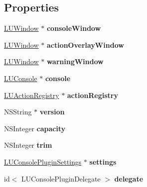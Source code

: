\subsection*{Properties}
\begin{DoxyCompactItemize}
\item 
\mbox{\label{interface_l_u_console_plugin_aaf88d87a74ebf974140af6d50caf53f4}} 
\mbox{\hyperlink{interface_l_u_window}{L\+U\+Window}} $\ast$ {\bfseries console\+Window}
\item 
\mbox{\label{interface_l_u_console_plugin_a374dac0530c45c7497c2d677461c7754}} 
\mbox{\hyperlink{interface_l_u_window}{L\+U\+Window}} $\ast$ {\bfseries action\+Overlay\+Window}
\item 
\mbox{\label{interface_l_u_console_plugin_ad94ff4234448c458582915a5bb0523bb}} 
\mbox{\hyperlink{interface_l_u_window}{L\+U\+Window}} $\ast$ {\bfseries warning\+Window}
\item 
\mbox{\label{interface_l_u_console_plugin_ae475df9e7221f0e7ef4e431c6a31a882}} 
\mbox{\hyperlink{interface_l_u_console}{L\+U\+Console}} $\ast$ {\bfseries console}
\item 
\mbox{\label{interface_l_u_console_plugin_a482862f40da2bea4ee39806c8a41f1fd}} 
\mbox{\hyperlink{interface_l_u_action_registry}{L\+U\+Action\+Registry}} $\ast$ {\bfseries action\+Registry}
\item 
\mbox{\label{interface_l_u_console_plugin_ab712b3b45312b5d76f326f1174a1db49}} 
N\+S\+String $\ast$ {\bfseries version}
\item 
\mbox{\label{interface_l_u_console_plugin_a4930c2c35a38b80138bb72f5c5f0af41}} 
N\+S\+Integer {\bfseries capacity}
\item 
\mbox{\label{interface_l_u_console_plugin_a87fdfd7904c979ef3447948a256ac974}} 
N\+S\+Integer {\bfseries trim}
\item 
\mbox{\label{interface_l_u_console_plugin_ab7f4b0344d1dd17cf3f7922a680f531f}} 
\mbox{\hyperlink{interface_l_u_console_plugin_settings}{L\+U\+Console\+Plugin\+Settings}} $\ast$ {\bfseries settings}
\item 
\mbox{\label{interface_l_u_console_plugin_a53fa7c0c8f343ad2a9fc225c226894f9}} 
id$<$ L\+U\+Console\+Plugin\+Delegate $>$ {\bfseries delegate}
\end{DoxyCompactItemize}


